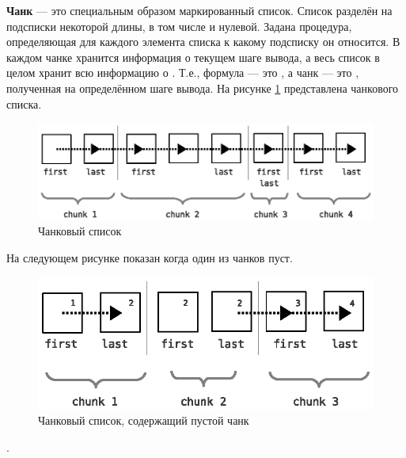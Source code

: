\textbf{Чанк} --- это специальным образом маркированный список. Список разделён на подсписки некоторой длины, в том числе и нулевой. Задана процедура, определяющая для каждого элемента списка к какому подсписку он относится. В каждом чанке хранится информация о текущем шаге вывода, а весь список в целом хранит всю информацию о . Т.е., формула --- это , а чанк --- это , полученная на определённом шаге вывода. На рисунке \ref{fig:chank1} представлена  чанкового списка.

\begin{figure}[h]
	\centering
	\includegraphics[width=0.6\linewidth]{pics/Chunk.eps}
	\caption{Чанковый список}
	\label{fig:chank1}
\end{figure}
На следующем рисунке показан  когда один из чанков пуст.

\begin{figure}[h]
	\centering
	\includegraphics[width=0.6\linewidth]{pics/Chunk2.eps}
	\caption{Чанковый список, содержащий пустой чанк}
	\label{fig:chank2}
\end{figure}

.


